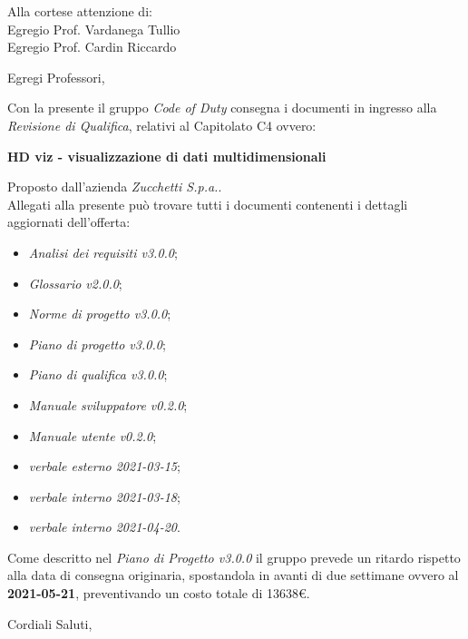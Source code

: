 \documentclass[11pt]{letter}
\begin{document}
\begin{letter}{Alla cortese attenzione di: \\ Egregio Prof. Vardanega Tullio \\ Egregio Prof. Cardin Riccardo}
\date{21 Aprile, 2021}
\opening{Egregi Professori,}
Con la presente il gruppo \textit{Code of Duty} consegna i documenti in ingresso alla \textit{Revisione di Qualifica}, relativi al Capitolato C4 ovvero:
\begin{center}
    \textbf{HD viz -  visualizzazione di dati multidimensionali}
\end{center}
Proposto dall'azienda \textit{Zucchetti S.p.a.}.\\
Allegati alla presente può trovare tutti i documenti contenenti i dettagli aggiornati dell'offerta:
\begin{itemize}
    \item \textit{Analisi dei requisiti v3.0.0};
    \item \textit{Glossario v2.0.0};
    \item \textit{Norme di progetto v3.0.0};
    \item \textit{Piano di progetto v3.0.0};
    \item \textit{Piano di qualifica v3.0.0};
    \item \textit{Manuale sviluppatore v0.2.0};
    \item \textit{Manuale utente v0.2.0};
    \item \textit{verbale esterno 2021-03-15};
    \item \textit{verbale interno 2021-03-18};
    \item \textit{verbale interno 2021-04-20}.
\end{itemize}

\pagebreak

Come descritto nel \textit{Piano di Progetto v3.0.0} il gruppo prevede un ritardo rispetto alla data di consegna originaria, spostandola in avanti di due settimane ovvero al \textbf{2021-05-21}, preventivando un costo totale di 13638€.
\closing{Cordiali Saluti,}
\end{letter}
\end{document}
